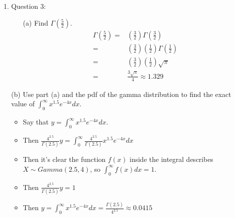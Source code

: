 \documentclass{article}
\begin{document}
\begin{enumerate}
\item Question 3:
    \begin{itemize}
    \item [(a)] Find $\Gamma\left(\frac{5}{2}\right)$.
        \begin{equation*}
        \begin{aligned}
        \Gamma\left(\frac{5}{2}\right) = & \left(\frac{3}{2}\right) \Gamma\left(\frac{3}{2}\right) \\
            = & \left(\frac{3}{2}\right) \left(\frac{1}{2}\right) \Gamma\left(\frac{1}{2}\right) \\
            = & \left(\frac{3}{2}\right) \left(\frac{1}{2}\right) \sqrt{\pi} \\
            = & \frac{3\sqrt{\pi}}{4} \approx 1.329
        \end{aligned}
        \end{equation*}
    \end{itemize}
    \item [(b)] Use part (a) and the pdf of the gamma distribution  to find the exact value of $\int_{0}^{\infty}x^{1.5}e^{-4x}dx$.
        \begin{itemize}
        \item Say that $y = \int_{0}^{\infty}x^{1.5}e^{-4x}dx$.
        \item Then $\frac{4^{2.5}}{\Gamma(2.5)} y = \int_{0}^{\infty} \frac{4^{2.5}}{\Gamma(2.5)} x^{1.5}e^{-4x} dx$
        \item Then it's clear the function $f(x)$ inside the integral describes $X \sim Gamma(2.5, 4)$, so $\int_{0}^{\infty} f(x) dx = 1$.
        \item Then $\frac{4^{2.5}}{\Gamma(2.5)} y = 1$
        \item Then $y = \int_{0}^{\infty}x^{1.5}e^{-4x}dx = \frac{\Gamma(2.5)}{4^{2.5}} \approx 0.0415$
        \end{itemize}
\end{enumerate}
\end{document}
